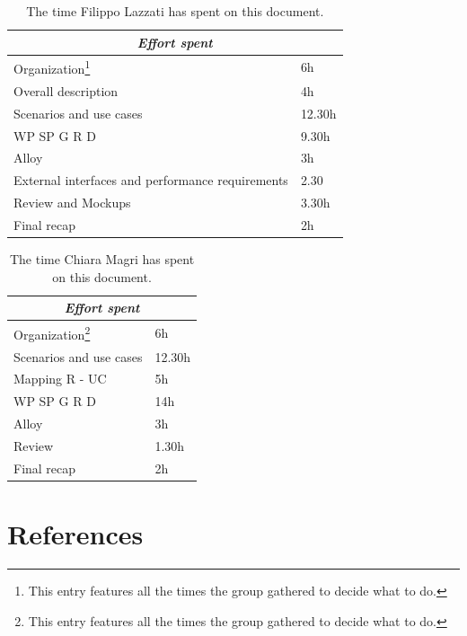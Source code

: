 \documentclass{article}
\begin{document}
\centering
\begin{longtable}{|m{5cm}|m{5cm}|}
\caption{The time Filippo Lazzati has spent on this document.}
 \label{filippo effort spent}
 \hline
 \multicolumn{2}{|c|}{\cellcolor{white}\emph{Effort spent}} \\
 \endfirsthead
 \endhead
 \endfoot
 \endlastfoot
 \hline
 Organization\footnote{This entry features all the times the group gathered to decide what to do.} & 6h\\
 \hline
 Overall description & 4h\\
 \hline
 Scenarios and use cases & 12.30h\\
 \hline
 WP SP G R D & 9.30h\\
 \hline
 Alloy & 3h\\
 \hline
 External interfaces and performance requirements & 2.30\\
 \hline
 Review and Mockups & 3.30h\\
 \hline
  Final recap & 2h\\
 \hline
\end{longtable}

\centering
\begin{longtable}{|m{5cm}|m{5cm}|}
\caption{The time Chiara Magri has spent on this document.}
 \label{chiara effort spent}
 \hline
 \multicolumn{2}{|c|}{\cellcolor{white}\emph{Effort spent}} \\
 \endfirsthead
 \endhead
 \endfoot
 \endlastfoot
 \hline
 Organization\footnote{This entry features all the times the group gathered to decide what to do.} & 6h\\
 \hline
 Scenarios and use cases & 12.30h\\
 \hline
 Mapping R - UC & 5h\\
 \hline
 WP SP G R D & 14h\\
 \hline
 Alloy & 3h\\
 \hline
 Review & 1.30h\\
 \hline
  Final recap & 2h\\
 \hline
\end{longtable}
\newpage
\section{References}
\end{document}
